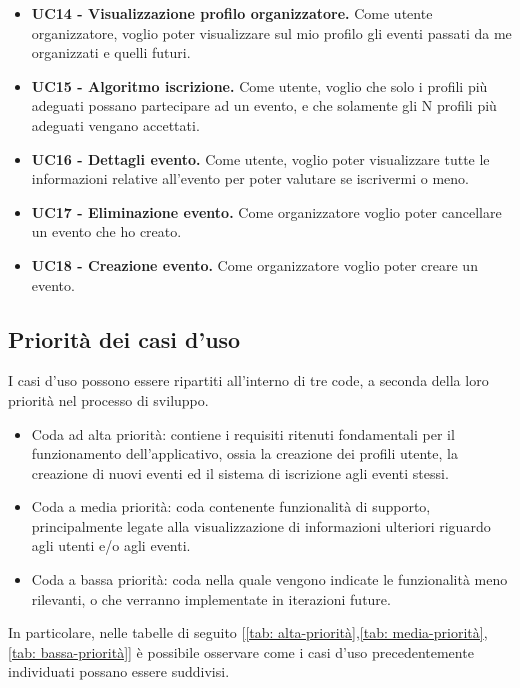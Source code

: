 \begin{itemize}
    \item \textbf{UC14 - Visualizzazione profilo organizzatore.} Come utente organizzatore, voglio poter visualizzare sul mio profilo gli eventi passati da me organizzati e quelli futuri.
    \item \textbf{UC15 - Algoritmo iscrizione.} Come utente, voglio che solo i profili più adeguati possano partecipare ad un evento, e che solamente gli N profili più adeguati vengano accettati.
    \item \textbf{UC16 - Dettagli evento.} Come utente, voglio poter visualizzare tutte le informazioni relative all’evento per poter valutare se iscrivermi o meno.
    \item \textbf{UC17 - Eliminazione evento.} Come organizzatore voglio poter cancellare un evento che ho creato.
    \item \textbf{UC18 - Creazione evento.} Come organizzatore voglio poter creare un evento.
\end{itemize}
\clearpage

\subsection{Priorità dei casi d'uso}

I casi d'uso possono essere ripartiti all'interno di tre code, a seconda della loro priorità nel processo di sviluppo.
\begin{itemize}
    \item Coda ad alta priorità: contiene i requisiti ritenuti fondamentali per il funzionamento dell'applicativo, ossia la creazione dei profili utente, la creazione di nuovi eventi ed il sistema di iscrizione agli eventi stessi.
    \item Coda a media priorità: coda contenente funzionalità di supporto, principalmente legate alla visualizzazione di informazioni ulteriori riguardo agli utenti e/o agli eventi.
    \item Coda a bassa priorità: coda nella quale vengono indicate le funzionalità meno rilevanti, o che verranno implementate in iterazioni future.
\end{itemize}

In particolare, nelle tabelle di seguito [\ref*{tab: alta-priorità},\ref*{tab: media-priorità},\ref*{tab: bassa-priorità}] 
è possibile osservare come i casi d'uso precedentemente individuati possano essere suddivisi.
\clearpage

